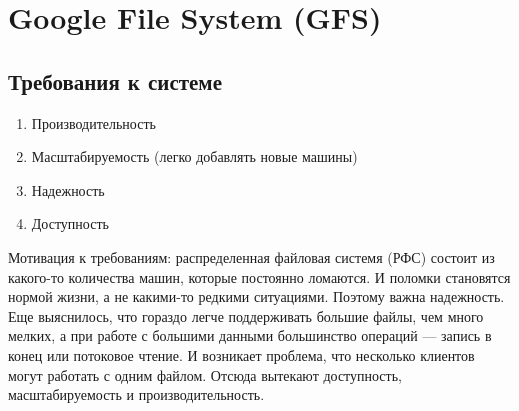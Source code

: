 \section{Google File System (GFS)}
    \subsection{Требования к системе}

    \begin{enumerate}
        \item Производительность
        \item Масштабируемость (легко добавлять новые машины)
        \item Надежность
        \item Доступность
    \end{enumerate}
    \quad Мотивация к требованиям: распределенная файловая системя (РФС) состоит из какого-то количества машин, которые постоянно ломаются. И поломки становятся нормой жизни, а не какими-то редкими ситуациями. Поэтому важна надежность. Еще выяснилось, что гораздо легче поддерживать большие файлы, чем много мелких, а при работе с большими данными большинство операций --- запись в конец или потоковое чтение. И возникает проблема, что несколько клиентов могут работать с одним файлом. Отсюда вытекают доступность, масштабируемость и производительность.
    
